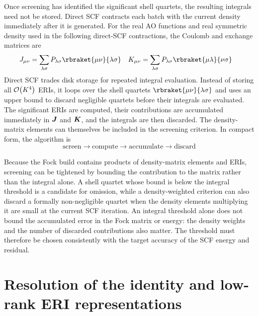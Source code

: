 Once screening has identified the significant shell quartets, the resulting
integrals need not be stored. Direct SCF contracts each batch with the current
density immediately after it is generated.
For the real AO functions and real symmetric density used in the following
direct-SCF contractions, the Coulomb and exchange matrices are
\begin{align}
 J_{\mu\nu}&=\sum_{\lambda\sigma}P_{\lambda\sigma}
 \rbraket{\mu\nu}{\lambda\sigma}
 &
 K_{\mu\nu}&=\sum_{\lambda\sigma}P_{\lambda\sigma}
 \rbraket{\mu\lambda}{\nu\sigma}
\end{align}
Direct SCF \citep{Almlof1982} trades disk storage for repeated integral evaluation. Instead of
storing all $\order{K^4}$ ERIs, it loops over the shell quartets
$\rbraket{\mu\nu}{\lambda\sigma}$ and uses an upper bound to discard
negligible quartets before their integrals are evaluated. The significant
ERIs are computed, their contributions are accumulated immediately in $\boldsymbol{J}$
and $\boldsymbol{K}$, and the integrals are then discarded.
The density-matrix elements can themselves be included in the screening
criterion. In compact form, the algorithm is
\begin{equation}
 \text{screen}\longrightarrow\text{compute}\longrightarrow
 \text{accumulate}\longrightarrow\text{discard}
\end{equation}

Because the Fock build contains products of density-matrix elements and ERIs,
screening can be tightened by bounding the contribution to the matrix rather
than the integral alone. A shell quartet whose bound is below the integral
threshold is a candidate for omission, while a density-weighted criterion can also discard a
formally non-negligible quartet when the density elements multiplying it are
small at the current SCF iteration. An integral threshold alone does not
bound the accumulated error in the Fock matrix or energy: the density
weights and the number of discarded contributions also matter. The threshold
must therefore be chosen consistently with the target accuracy of the SCF
energy and residual.

\section{Resolution of the identity and low-rank ERI representations}
\label{sec:ri}

